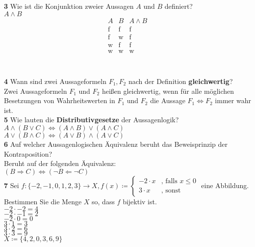 \documentclass[11pt]{article}
\begin{document}
{{    \textbf{3} Wie ist die Konjunktion zweier Aussagen $A$ und $B$ definiert?\\
    $A \land B$ 
    \[
        \begin{array}{c|c|c}
            A & B & A \land B \\
            \hline
            \text{f} & \text{f} & \text{f} \\
            \text{f} & \text{w} & \text{f} \\
            \text{w} & \text{f} & \text{f} \\
            \text{w} & \text{w} & \text{w} \\
        \end{array}
    \]\\\\


    \textbf{4} Wann sind zwei Aussageformeln $F_1, F_2$ nach der Definition \textbf{gleichwertig}?\\
    Zwei Aussageformeln $F_1$ und $F_2$ heißen gleichwertig, wenn für alle möglichen Besetzungen von Wahrheitswerten in $F_1$ und $F_2$ die Aussage $F_1 \Leftrightarrow F_2$ immer wahr ist.\\

    \textbf{5} Wie lauten die \textbf{Distributivgesetze} der Aussagenlogik?\\
    $A \land (B \lor C) \iff (A \land B) \lor (A \land C)$\\
    $A \lor (B \land C) \iff (A \lor B) \land (A \lor C)$\\


    \textbf{6} Auf welcher Aussagenlogischen Äquivalenz beruht das Beweisprinzip der Kontraposition?\\
    Beruht auf der folgenden Äquivalenz:\\
    $(B \Rightarrow C) \Leftrightarrow (\neg B \Leftarrow \neg C)$\\

    \textbf{7} Sei $f : \{-2,-1,0,1,2,3\} \rightarrow X, f(x) \coloneqq  \begin{cases}
                                                                    -2 \cdot x & \text{, falls $x \leq 0$} \\
                                                                    3 \cdot x & \text{, sonst}
    \end{cases}$ eine Abbildung. Bestimmen Sie die Menge $X$ so, dass $f$ bijektiv ist.\\
    $-2 \cdot -2 = 4$\\
    $-2 \cdot -1 = 2$\\
    $-2 \cdot 0 = 0$\\
    $3 \cdot 1 = 3$\\
    $3 \cdot 2 = 6$\\
    $3 \cdot 3 = 9$\\
    $X \coloneqq \{4,2,0,3,6,9\}$\\

}}
\end{document}
